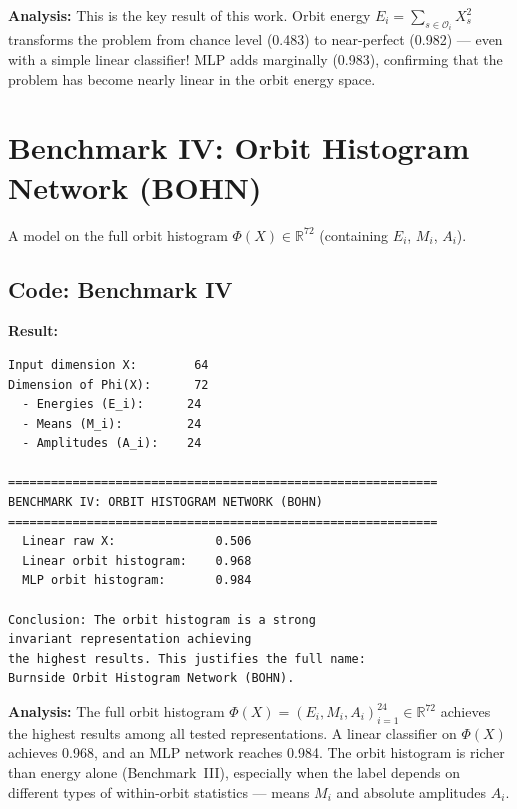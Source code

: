 \documentclass[11pt,a4paper]{report}
\begin{document}
\textbf{Analysis:} This is the key result of this work. Orbit energy $E_i = \sum_{s\in\mathcal{O}_i} X_s^2$ transforms the problem from chance level (0.483) to near-perfect (0.982) --- even with a simple linear classifier! MLP adds marginally (0.983), confirming that the problem has become nearly linear in the orbit energy space.


\section{Benchmark IV: Orbit Histogram Network (BOHN)}

A model on the full orbit histogram $\Phi(X)\in\mathbb{R}^{72}$ (containing $E_i$, $M_i$, $A_i$).

\subsection{Code: Benchmark IV}

\noindent{}


\textbf{Result:}
\begin{verbatim}
Input dimension X:        64
Dimension of Phi(X):      72
  - Energies (E_i):      24
  - Means (M_i):         24
  - Amplitudes (A_i):    24

============================================================
BENCHMARK IV: ORBIT HISTOGRAM NETWORK (BOHN)
============================================================
  Linear raw X:              0.506
  Linear orbit histogram:    0.968
  MLP orbit histogram:       0.984

Conclusion: The orbit histogram is a strong
invariant representation achieving
the highest results. This justifies the full name:
Burnside Orbit Histogram Network (BOHN).
\end{verbatim}

\textbf{Analysis:} The full orbit histogram $\Phi(X) = (E_i, M_i, A_i)_{i=1}^{24} \in \mathbb{R}^{72}$ achieves the highest results among all tested representations. A linear classifier on $\Phi(X)$ achieves 0.968, and an MLP network reaches 0.984. The orbit histogram is richer than energy alone (Benchmark~III), especially when the label depends on different types of within-orbit statistics --- means $M_i$ and absolute amplitudes $A_i$.
\end{document}
